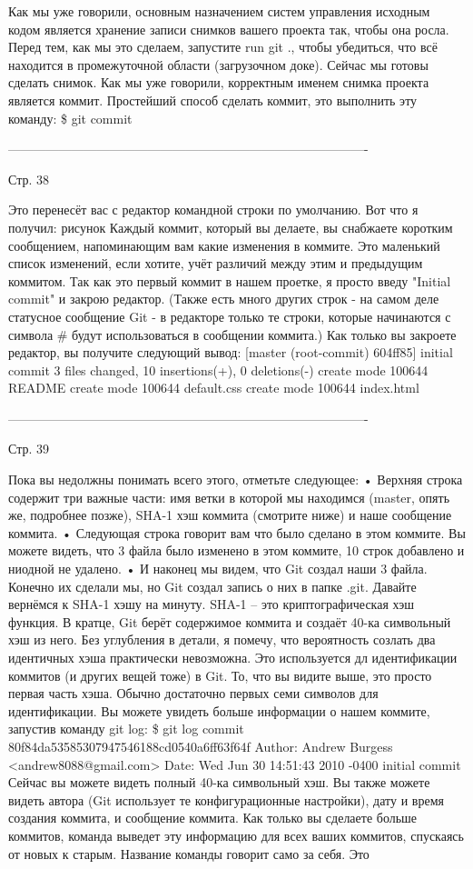 Как мы уже говорили, основным назначением систем управления исходным кодом является
хранение записи снимков вашего проекта так, чтобы она росла. Перед тем, как мы это 
сделаем, запустите run git ., чтобы убедиться, что всё находится в промежуточной 
области (загрузочном доке). Сейчас мы готовы сделать снимок.
Как мы уже говорили, корректным именем снимка проекта является коммит. Простейший
способ сделать коммит, это выполнить эту команду:
\$ git commit

-------------------------------------------------------------------------------------

Стр. 38

Это перенесёт вас с редактор командной строки по умолчанию. Вот что я получил:
{рисунок}
Каждый коммит, который вы делаете, вы снабжаете коротким сообщением, напоминающим
вам какие изменения в коммите. Это маленький список изменений, если хотите, учёт 
различий между этим и предыдущим коммитом. Так как это первый коммит в нашем проетке,
я просто введу "Initial commit" и закрою редактор. (Также есть много других строк - на
самом деле статусное сообщение Git - в редакторе только те строки, которые начинаются 
с символа # будут использоваться в сообщении коммита.)
Как только вы закроете редактор, вы получите следующий вывод:
[master (root-commit) 604ff85] initial commit
3 files changed, 10 insertions(+), 0 deletions(-)
create mode 100644 README
create mode 100644 default.css
create mode 100644 index.html

-------------------------------------------------------------------------------------

Стр. 39

Пока вы недолжны понимать всего этого, отметьте следующее:
        • Верхняя строка содержит три важные части: имя ветки в которой мы находимся
        (master, опять же, подробнее позже), SHA-1 хэш коммита (смотрите ниже) и наше
        сообщение коммита.
        • Следующая строка говорит вам что было сделано в этом коммите. Вы можете
        видеть, что 3 файла было изменено в этом коммите, 10 строк добавлено и ниодной
        не удалено.
        • И наконец мы видем, что Git создал наши 3 файла. Конечно их сделали мы, но Git
        создал запись о них в папке .git.
Давайте вернёмся к SHA-1 хэшу на минуту. SHA-1 -- это криптографическая хэш функция. В
кратце, Git берёт содержимое коммита и создаёт 40-ка символьный хэш из него. Без 
углубления в детали, я помечу, что вероятность созлать два идентичных хэша практически
невозможна. Это используется дл идентификации коммитов (и других вещей тоже) в Git. То,
что вы видите выше, это просто первая часть хэша. Обычно достаточно первых семи символов
для идентификации.
Вы можете увидеть больше информации о нашем коммите, запустив команду git log:
\$ git log
commit 80f84da53585307947546188cd0540a6ff63f64f
Author: Andrew Burgess <andrew8088@gmail.com>
Date:
Wed Jun 30 14:51:43 2010 -0400
initial commit
Сейчас вы можете видеть полный 40-ка символьный хэш. Вы также можете видеть автора (Git
использует те конфигурационные настройки), дату и время создания коммита, и сообщение
коммита. Как только вы сделаете больше коммитов, команда выведет эту информацию для всех
ваших коммитов, спускаясь от новых к старым. Название команды говорит само за себя. Это

